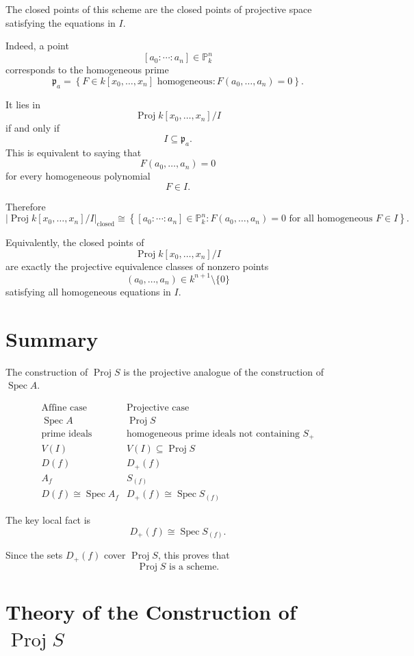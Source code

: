 \documentclass[12pt,a4paper]{article}
\DeclareMathOperator{\Spec}{Spec}
\DeclareMathOperator{\Proj}{Proj}
\theoremstyle{notespace}
\begin{document}
The closed points of this scheme are the closed points of projective space satisfying
the equations in \(I\).

Indeed, a point
\[
[a_0:\cdots:a_n]\in \mathbb P_k^n
\]
corresponds to the homogeneous prime
\[
\mathfrak p_a
=
\left\{
F\in k[x_0,\dots,x_n] \text{ homogeneous} :
F(a_0,\dots,a_n)=0
\right\}.
\]

It lies in
\[
\Proj k[x_0,\dots,x_n]/I
\]
if and only if
\[
I\subseteq \mathfrak p_a.
\]
This is equivalent to saying that
\[
F(a_0,\dots,a_n)=0
\]
for every homogeneous polynomial
\[
F\in I.
\]

Therefore
\[
\boxed{
	\left|
	\Proj k[x_0,\dots,x_n]/I
	\right|_{\mathrm{closed}}
	\cong
	\left\{
	[a_0:\cdots:a_n]\in \mathbb P_k^n :
	F(a_0,\dots,a_n)=0
	\text{ for all homogeneous }F\in I
	\right\}.
}
\]

Equivalently, the closed points of
\[
\Proj k[x_0,\dots,x_n]/I
\]
are exactly the projective equivalence classes of nonzero points
\[
(a_0,\dots,a_n)\in k^{n+1}\setminus\{0\}
\]
satisfying all homogeneous equations in \(I\).

\section{Summary}

The construction of \(\Proj S\) is the projective analogue of the construction of
\(\Spec A\).

\[
\begin{array}{c|c}
	\text{Affine case} & \text{Projective case} \\
	\hline
	\Spec A & \Proj S \\
	\text{prime ideals} & \text{homogeneous prime ideals not containing }S_+ \\
	V(I) & V(I)\subseteq \Proj S \\
	D(f) & D_+(f) \\
	A_f & S_{(f)} \\
	D(f)\cong \Spec A_f & D_+(f)\cong \Spec S_{(f)}
\end{array}
\]

The key local fact is
\[
\boxed{
	D_+(f)\cong \Spec S_{(f)}.
}
\]

Since the sets \(D_+(f)\) cover \(\Proj S\), this proves that
\[
\boxed{
	\Proj S \text{ is a scheme.}
}
\]







\section{Theory of the Construction of \texorpdfstring{$\Proj S$}{Proj S}}
\end{document}
